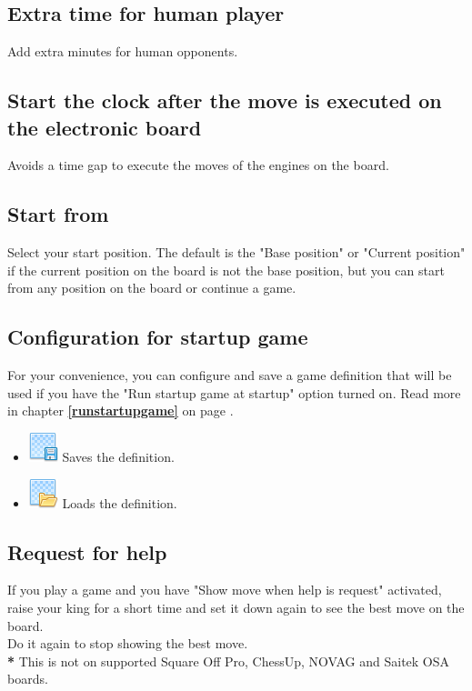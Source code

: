 \documentclass[11pt,a4paper]{article}
\begin{document}
\subsection{Extra time for human player}
Add extra minutes for human opponents.

\subsection{Start the clock after the move is executed on the electronic board}
Avoids a time gap to execute the moves of the engines on the board.


\subsection{Start from}
Select your start position. The default is the "Base position" or "Current position" if the current position on the board is not the base position, but you can start from any position on the board or continue a game.



\subsection{Configuration for startup game} \label{startupgame}

For your convenience, you can configure and save a game definition that will be used if you have the "Run startup game at startup" option turned on.  Read more in chapter \textbf{\ref{runstartupgame}  } on page \pageref{runstartupgame}.

\begin{itemize}
	  \item \includegraphics[scale=0.5]{layer_save.png} Saves the definition.
  	  \item \includegraphics[scale=0.5]{layer_open.png} Loads the definition.
\end{itemize}


\subsection{Request for help}
If you play a game and you have "Show move when help is request" activated, raise your king for a short time and set it down again to see the best move on the board.\\
Do it again to stop showing the best move.\\
{\color{red}\textbf{*}} This is not on supported Square Off Pro, ChessUp, NOVAG and Saitek OSA boards.
\end{document}
